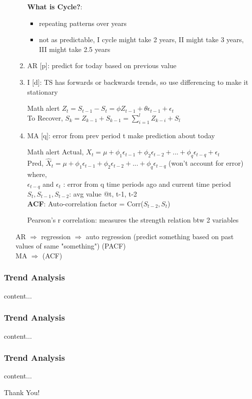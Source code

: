 \documentclass{beamer}
\begin{document}
\begin{frame}[allowframebreaks]
\begin{enumerate}
\begin{enumerate}
			\textbf{What is Cycle?}: 
			\begin{itemize}
				\item repeating patterns over years
				\item not as predictable, I cycle might take 2 years, II might take 3 years, III might take 2.5 years
			\end{itemize}
			\item AR [p]: predict for today based on previous value
			\item I [d]: TS has forwards or backwards trends, so use differencing to make it stationary\\
			\begin{alertblock}{Math alert}
				$Z_t = S_{t-1}-S_t = \phi Z_{t-1} + \theta \epsilon_{t-1} + \epsilon_t $\\
				To Recover, $S_k = Z_{k-1}+S_{k-1} = \sum_{i=1}^{l}Z_{k-i} + S_l$\\				
			\end{alertblock}
			\item MA [q]: error from prev period t make prediction about today
			\begin{alertblock}{Math alert}
				Actual, $X_t = \mu + \phi_1\epsilon_{t-1} + \phi_2\epsilon_{t-2} + ... + \phi_q\epsilon_{t-q} + \epsilon_t $\\
				Pred, $\hat{X}_t = \mu + \phi_1\epsilon_{t-1} + \phi_2\epsilon_{t-2} + ... + \phi_q\epsilon_{t-q} $ (won't account for error)\\
				where,\\
				$\epsilon_{t-q}$ and $\epsilon_t$ : error from q time periods ago and current time period\\
				$S_t, S_{t-1}, S_{t-2}$: avg value @t, t-1, t-2\\
				\textbf{ACF}: Auto-correlation factor = Corr($S_{t-2}, S_t$)\\
			\end{alertblock}
			Pearson's r correlation: measures the strength relation btw	2 variables\\
		\end{enumerate}
		AR $\Rightarrow$ regression $\Rightarrow$ auto regression (predict something based on past values of same "something") (PACF)\\
		MA $\Rightarrow$ (ACF)\\
	\end{enumerate}	
\end{frame}	

\begin{frame}\frametitle{Trend Analysis}
content...
\end{frame}	

\begin{frame}\frametitle{Trend Analysis}
content...
\end{frame}	

\begin{frame}\frametitle{Trend Analysis}
content...
\end{frame}	

\begin{frame}
Thank You!
\end{frame}
\end{document}
